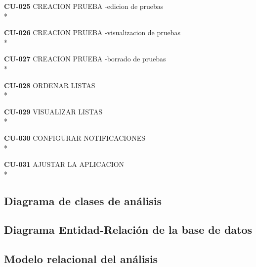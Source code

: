 \documentclass[../pfc.tex]{subfiles}
\begin{document}
	\textbf{CU-025}	CREACION PRUEBA -edicion de pruebas\\*
	
	\textbf{CU-026}	CREACION PRUEBA -visualizacion de pruebas\\*
	
	\textbf{CU-027}	CREACION PRUEBA -borrado de pruebas\\*
	
	
	
	\textbf{CU-028}	ORDENAR LISTAS\\*
	
	
	
	\textbf{CU-029}	VISUALIZAR LISTAS\\*
	
	
	
	\textbf{CU-030}	CONFIGURAR NOTIFICACIONES\\*
	
	
	
	\textbf{CU-031}	AJUSTAR LA APLICACION\\*
	
	
		
	\subsection{Diagrama de clases de análisis}
		
	\subsection{Diagrama Entidad-Relación de la base de datos}
		
	\subsection{Modelo relacional del análisis}
	
\end{document}
